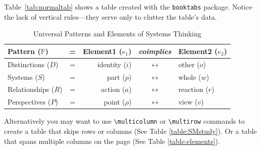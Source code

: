 \documentclass{tufte-handout}
\newcommand{\docpkg}[1]{\texttt{#1}}%
\begin{document}
Table~\ref{tab:normaltab} shows a table created with the \docpkg{booktabs} package.  Notice the lack of vertical rules---they serve only to clutter the table's data.



\begin{table}[ht]
\centering
\setlength{\tabcolsep}{6pt}
\renewcommand{\arraystretch}{2}
  \selectfont
\begin{tabular}{ l  c  r c l} \toprule
\textbf{Pattern} \textbf{($\mathbb{P}$)}& \textbf{=} & \textbf{Element1} ($e_1$)    & \textit{\textbf{coimplies}} & \textbf{Element2} ($e_2$)\\
 \midrule
Distinctions ($D$)& = & identity ($i$)    & $\leftrightarrow$ & other ($o$)\\

Systems ($S$)& = & part ($p$)        & $\leftrightarrow$ & whole ($w$)\\
Relationships ($R$)& = & action ($a$)      & $\leftrightarrow$ & reaction ($r$)\\
Perspectives ($P$)& = & point ($\rho$)    & $\leftrightarrow$ & view ($v$)\\
\bottomrule
\end{tabular}
\caption{Universal Patterns and Elements of Systems Thinking}
\label{table:1}
\end{table}

Alternatively you may want to use \verb|\multicolumn| or \verb|\multirow| commands to create a table that skips rows or columns (See Table \ref{table:SMstudy}).  Or a table that spans multiple columns on the page (See Table \ref{table:elements}).
\end{document}
